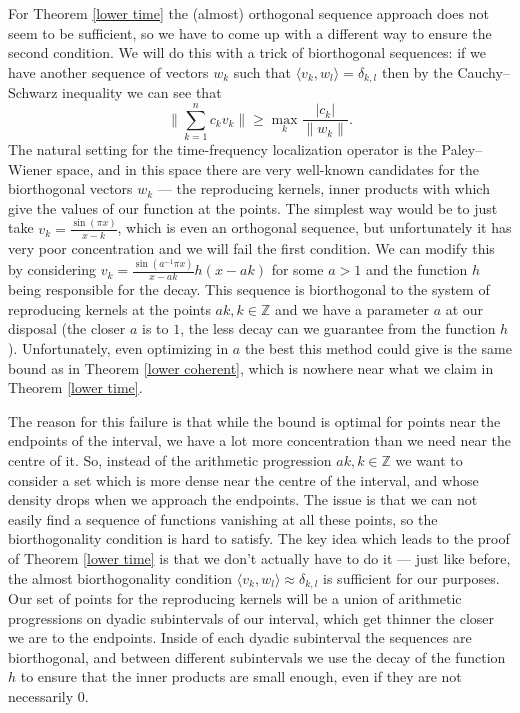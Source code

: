 \documentclass[12pt]{amsart}
\numberwithin{equation}{section}
\newcommand{\Z}{\mathbb{Z}}
\begin{document}
For Theorem \ref{lower time} the (almost) orthogonal sequence approach does not seem to be sufficient, so we have to come up with a different way to ensure the second condition. We will do this with a trick of biorthogonal sequences: if we have another sequence of vectors $w_k$ such that $\langle v_k, w_l\rangle = \delta_{k, l}$ then by the Cauchy--Schwarz inequality we can see that
$$\|\sum_{k=1}^n c_k v_k\| \ge \max_k \frac{|c_k|}{\|w_k\|}.$$
The natural setting for the time-frequency localization operator is the Paley--Wiener space, and in this space there are very well-known candidates for the biorthogonal vectors $w_k$ --- the reproducing kernels, inner products with which give the values of our function at the points. The simplest way would be to just take $v_k = \frac{\sin(\pi x)}{x-k}$, which is even an orthogonal sequence, but unfortunately it has very poor concentration and we will fail the first condition. We can modify this by considering $v_k = \frac{\sin(a^{-1}\pi x)}{x-ak}h(x-ak)$ for some $a > 1$ and the function $h$ being responsible for the decay. This sequence is biorthogonal to the system of reproducing kernels at the points $ak, k\in \Z$ and we have a parameter $a$ at our disposal (the closer $a$ is to $1$, the less decay can we guarantee from the function $h$). Unfortunately, even optimizing in $a$ the best this method could give is the same bound as in Theorem \ref{lower coherent}, which is nowhere near what we claim in Theorem \ref{lower time}.

The reason for this failure is that while the bound is optimal for points near the endpoints of the interval, we have a lot more concentration than we need near the centre of it. So, instead of the arithmetic progression $ak, k\in \Z$ we want to consider a  set which is more dense near the centre of the interval, and whose density drops when we approach the endpoints. The issue is that we can not easily find a sequence of functions vanishing at all these points, so the biorthogonality condition is hard to satisfy. The key idea which leads to the proof of Theorem \ref{lower time} is that we don't actually have to do it --- just like before, the almost biorthogonality condition $\langle v_k, w_l\rangle \approx \delta_{k, l}$ is sufficient for our purposes. Our set of points for the reproducing kernels will be a union of arithmetic progressions on dyadic subintervals of our interval, which get thinner the closer we are to the endpoints. Inside of each dyadic subinterval the sequences are biorthogonal, and between different subintervals we use the decay of the function $h$ to ensure that the inner products are small enough, even if they are not necessarily $0$. 
\end{document}
